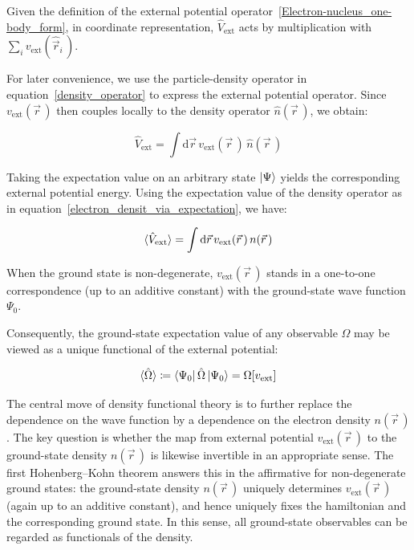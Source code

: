 Given the definition of the external potential operator~\eqref{Electron-nucleus_one-body_form}, in coordinate representation, $\hat{V}_\mathrm{ext}$ acts by multiplication with $\sum_i v_\mathrm{ext}(\hat{\vec{r}}_i\,)$.

For later convenience, we use the particle-density operator in equation~\eqref{density_operator} to express the external potential operator.
Since $v_\mathrm{ext}(\vec{r}\,)$ then couples locally to the density operator $\hat{n}(\vec{r}\,)$, we obtain:

\begin{equation}
    \hat{V}_\mathrm{ext}=\int\mathrm{d}\vec{r}\,v_\mathrm{ext}(\vec{r}\,)\,\hat{n}(\vec{r}\,)
\label{local_external_potential_operator_definition}
\end{equation}

Taking the expectation value on an arbitrary state $\ket{\Psi}$ yields the corresponding external potential energy. Using the expectation value of the density operator as in
equation~\eqref{electron_densit_via_expectation}, we have:

\begin{equation}
    \braket{\hat{V}_\mathrm{ext}}=\int\mathrm{d}\vec{r}\,v_\mathrm{ext}(\vec{r}\,)\,n(\vec{r}\,)
\label{external_potential_energy_expectation}
\end{equation}

When the ground state is non-degenerate, $v_\mathrm{ext}(\vec{r}\,)$ stands in a one-to-one correspondence (up to an additive constant) with the ground-state wave function $\Psi_0$.

Consequently, the ground-state expectation value of any observable $\hat{\Omega}$ may be viewed as a unique functional of the external potential:

\begin{equation}
   \braket{\hat{\Omega}}\coloneqq \bra{\Psi_0}\hat{\Omega}\ket{\Psi_0}=\Omega[v_\mathrm{ext}]
\label{functional_from_external_potential}
\end{equation}

The central move of density functional theory is to further replace the dependence on the wave function by a dependence on the electron density $n(\vec{r}\,)$.
The key question is whether the map from external potential $v_\mathrm{ext}(\vec{r}\,)$ to the ground-state density $n(\vec{r}\,)$ is likewise invertible in an appropriate sense.
The first Hohenberg--Kohn theorem answers this in the affirmative for non-degenerate ground states: the ground-state density $n(\vec{r}\,)$ uniquely determines $v_\mathrm{ext}(\vec{r}\,)$ (again up to an additive constant), and hence uniquely fixes the hamiltonian and the corresponding ground state.
In this sense, all ground-state observables can be regarded as functionals of the density.


